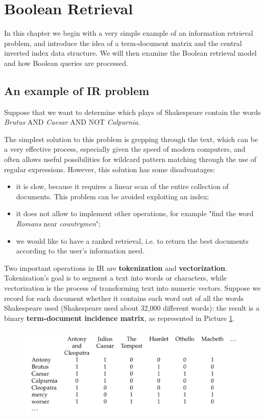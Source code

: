 \section{Boolean Retrieval} \label{ch2}
In this chapter we begin with a very simple example of an information retrieval problem, and introduce the idea of a term-document matrix and the central inverted index data structure. We will then examine the Boolean retrieval model and how Boolean queries are processed. 

\subsection{An example of IR problem}
Suppose that we want to determine which plays of Shakespeare contain the words \textit{Brutus} AND \textit{Caesar} AND NOT \textit{Calpurnia}. 

The simplest solution to this problem is grepping through the text, which can be a very effective process, especially given the speed of modern computers, and often allows useful possibilities for wildcard pattern matching through the use of regular expressions. However, this solution has some disadvantages:

\begin{itemize}
    \item it is slow, because it requires a linear scan of the entire collection of documents. This problem can be avoided exploiting an index;
    \item it does not allow to implement other operations, for example "find the word \textit{Romans} near \textit{countrymen}";
    \item we would like to have a ranked retrieval, i.e. to return the best documents according to the user's information need.
\end{itemize}

Two important operations in IR are \textbf{tokenization} and \textbf{vectorization}. Tokenization's goal is to segment a text into words or characters, while vectorization is the process of transforming text into numeric vectors.
Suppose we record for each document whether it contains each word out of all the words Shakespeare used (Shakespeare used about 32,000 different words): the result is a binary \textbf{term-document incidence matrix}, as represented in Picture \ref{inc_mat}.

\begin{figure}[h!]
		\centering
		\includegraphics[scale = 0.6]{img/incidence matrix.jpg}
		\label{inc_mat}
\end{figure}

